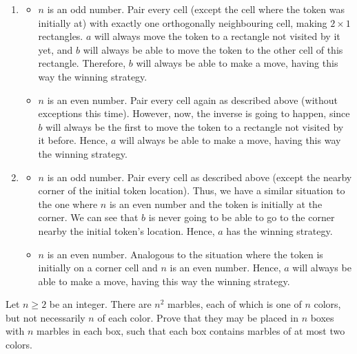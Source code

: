 \begin{enumerate}
	Call $a$ and $b$ the two players, where $a$ moves first.
	\item
	      \begin{itemize}
		      \item $n$ is an odd number. Pair every cell (except the cell where the token was initially at) with exactly one orthogonally neighbouring cell, making $2\times1$ rectangles.
		            $a$ will always move the token to a rectangle not visited by it yet, and $b$ will always be able to move the token to the other cell of this rectangle.
		            Therefore, $b$ will always be able to make a move, having this way the winning strategy.
		      \item $n$ is an even number. Pair every cell again as described above (without exceptions this time). However, now, the inverse is going to happen, since $b$ will always be the first to move the token to a
		            rectangle not visited by it before. Hence, $a$ will always be able to make a move, having this way the winning strategy.
	      \end{itemize}
	\item
	      \begin{itemize}
		      \item $n$ is an odd number. Pair every cell as described above (except the nearby corner of the initial token location).
		            Thus, we have a similar situation to the one where $n$ is an even number and the token is initially at the corner.
		            We can see that $b$ is never going to be able to go to the corner nearby the initial token's location. Hence, $a$ has the winning strategy.
		      \item $n$ is an even number. Analogous to the situation where the token is initially on a corner cell and $n$ is an even number.
		            Hence, $a$ will always be able to make a move, having this way the winning strategy.
	      \end{itemize}

\end{enumerate}
\clearpage


\begin{problem}
Let $n \ge 2$ be an integer.
There are $n^2$ marbles, each of which is one of $n$ colors,
but not necessarily $n$ of each color.
Prove that they may be placed in $n$ boxes
with $n$ marbles in each box,
such that each box contains marbles of at most two colors.
\end{problem}

